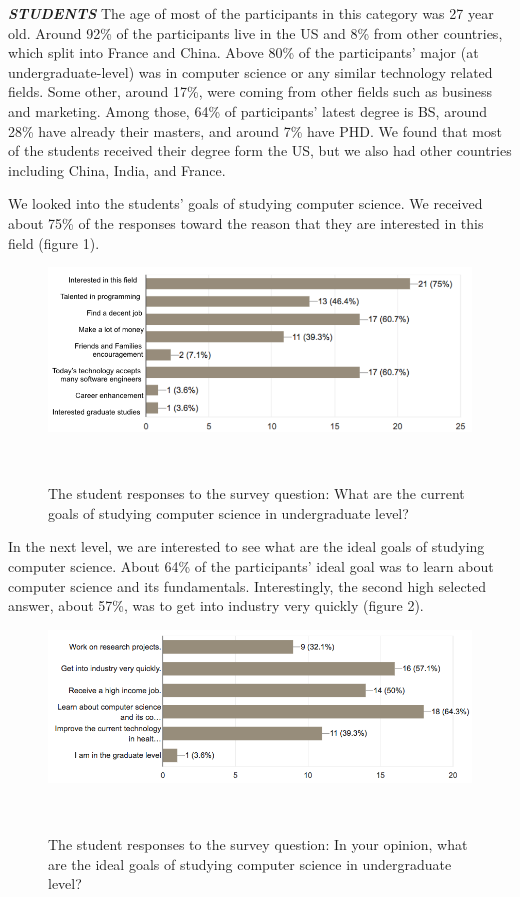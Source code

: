 \documentclass{sigchi}
\begin{document}
\textit{\textbf{STUDENTS}}\newline
The age of most of the participants in this category was 27 year old. Around 92\% of the participants live in the US and 8\% from other countries, which split into France and China.  Above 80\% of the participants' major (at undergraduate-level) was in computer science or any similar technology related fields. Some other, around 17\%, were coming from other fields such as business and marketing. Among those, 64\% of participants' latest degree is BS, around 28\% have already their masters, and around 7\% have PHD. We found that most of the students received their degree form the US, but we also had other countries including China, India, and France.

We looked into the students' goals of studying computer science. We received about 75\% of the responses toward the reason that they are interested in this field (figure 1).

\begin{figure}
\centering
  \includegraphics[width=1.05\columnwidth]{figures/goals_s}
  \caption{The student responses to the survey question: What are the current goals of studying computer science in undergraduate level? }~\label{fig:figure1}
\end{figure}

In the next level, we are interested to see what are the ideal goals of studying computer science. About 64\% of the participants' ideal goal was to learn about computer science and its fundamentals. Interestingly, the second high selected answer, about 57\%, was to get into industry very quickly (figure 2).

\begin{figure}
\centering
  \includegraphics[width=1.05\columnwidth]{figures/ideal_goals_s}
  \caption{The student responses to the survey question: In your opinion, what are the ideal goals of studying computer science in undergraduate level?}~\label{fig:figure2}
\end{figure}
\end{document}
